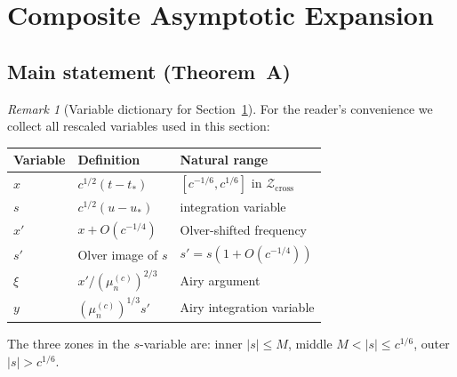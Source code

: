 \documentclass[12pt,a4paper]{amsart}
\theoremstyle{definition}
\theoremstyle{remark}
\newtheorem{remark}[theorem]{Remark}
\newcommand{\ustar}{u_*}
\newcommand{\Zcross}{\mathcal{Z}_{\mathrm{cross}}}
\newcommand{\tstar}{t_*}
\begin{document}
\section{Composite Asymptotic Expansion}
\label{sec:composite}

\subsection{Main statement (Theorem~A)}

\begin{remark}[Variable dictionary for Section~\ref{sec:composite}]
\label{rem:variables}
For the reader's convenience we collect
all rescaled variables used in this section:
\begin{center}
\renewcommand{\arraystretch}{1.4}
\begin{tabular}{lll}
\toprule
Variable & Definition & Natural range \\
\midrule
$x$ & $c^{1/2}(t - \tstar)$
    & $[c^{-1/6}, c^{1/6}]$ in $\Zcross$ \\
$s$ & $c^{1/2}(u - \ustar)$
    & integration variable \\
$x'$ & $x + O(c^{-1/4})$
     & Olver-shifted frequency \\
$s'$ & Olver image of $s$
     & $s' = s(1 + O(c^{-1/4}))$ \\
$\xi$ & $x'/(\mu_n^{(c)})^{2/3}$
      & Airy argument \\
$y$  & $(\mu_n^{(c)})^{1/3} s'$
     & Airy integration variable \\
\bottomrule
\end{tabular}
\end{center}
The three zones in the $s$-variable are:
inner $|s| \le M$,
middle $M < |s| \le c^{1/6}$,
outer $|s| > c^{1/6}$.
\end{remark}
\end{document}
